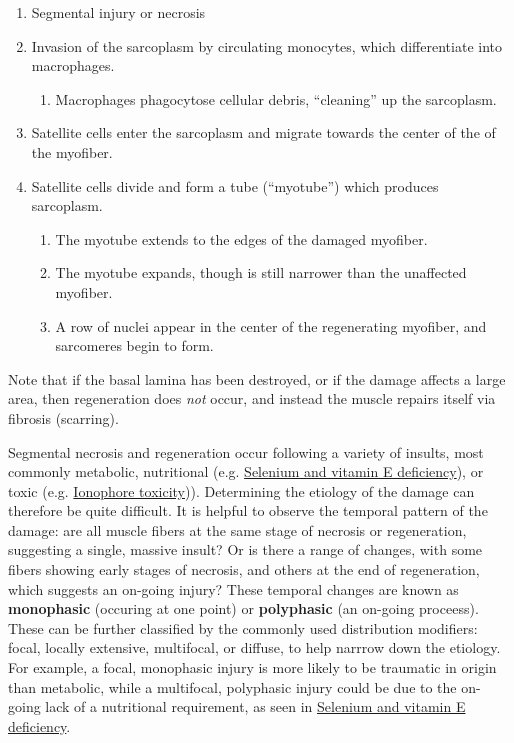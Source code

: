 \documentclass[openany]{book}
\providecommand{\tightlist}{%
  \setlength{\itemsep}{0pt}\setlength{\parskip}{0pt}}
\begin{document}
\begin{enumerate}
\def\labelenumi{\arabic{enumi}.}
\tightlist
\item
  Segmental injury or necrosis
\item
  Invasion of the sarcoplasm by circulating monocytes, which
  differentiate into macrophages.

  \begin{enumerate}
  \def\labelenumii{\roman{enumii})}
  \tightlist
  \item
    Macrophages phagocytose cellular debris, ``cleaning'' up the
    sarcoplasm.
  \end{enumerate}
\item
  Satellite cells enter the sarcoplasm and migrate towards the center of
  the of the myofiber.
\item
  Satellite cells divide and form a tube (``myotube'') which produces
  sarcoplasm.

  \begin{enumerate}
  \def\labelenumii{\roman{enumii})}
  \tightlist
  \item
    The myotube extends to the edges of the damaged myofiber.
  \item
    The myotube expands, though is still narrower than the unaffected
    myofiber.
  \item
    A row of nuclei appear in the center of the regenerating myofiber,
    and sarcomeres begin to form.
  \end{enumerate}
\end{enumerate}

Note that if the basal lamina has been destroyed, or if the damage
affects a large area, then regeneration does \emph{not} occur, and
instead the muscle repairs itself via fibrosis (scarring).

Segmental necrosis and regeneration occur following a variety of
insults, most commonly metabolic, nutritional (e.g.
\protect\hyperlink{selenium-and-vitamin-e-deficiency}{Selenium and
vitamin E deficiency}), or toxic (e.g.
\protect\hyperlink{ionophore-toxicity}{Ionophore toxicity})).
Determining the etiology of the damage can therefore be quite difficult.
It is helpful to observe the temporal pattern of the damage: are all
muscle fibers at the same stage of necrosis or regeneration, suggesting
a single, massive insult? Or is there a range of changes, with some
fibers showing early stages of necrosis, and others at the end of
regeneration, which suggests an on-going injury? These temporal changes
are known as \textbf{monophasic} (occuring at one point) or
\textbf{polyphasic} (an on-going proceess). These can be further
classified by the commonly used distribution modifiers: focal, locally
extensive, multifocal, or diffuse, to help narrrow down the etiology.
For example, a focal, monophasic injury is more likely to be traumatic
in origin than metabolic, while a multifocal, polyphasic injury could be
due to the on-going lack of a nutritional requirement, as seen in
\protect\hyperlink{selenium-and-vitamin-e-deficiency}{Selenium and
vitamin E deficiency}.
\end{document}
